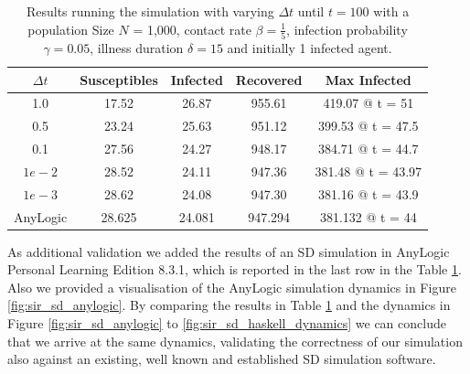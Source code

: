 \begin{table}
  \centering
  \begin{tabular}{ c || c | c | c | c }
    $\Delta t$ & Susceptibles & Infected & Recovered & Max Infected \\ \hline \hline 
    1.0 & 17.52 & 26.87 & 955.61 & 419.07 @ t = 51 \\ \hline
    0.5 & 23.24 & 25.63 & 951.12 & 399.53 @ t = 47.5 \\ \hline
    0.1 & 27.56 & 24.27 & 948.17 & 384.71 @ t = 44.7 \\ \hline
    $1e-2$ & 28.52 & 24.11 & 947.36 & 381.48 @ t = 43.97 \\ \hline
    $1e-3$ & 28.62 & 24.08 & 947.30 & 381.16 @ t = 43.9  \\ \hline \hline
    AnyLogic & 28.625 & 24.081 & 947.294 & 381.132 @ t = 44
    
  \end{tabular}
  \caption{Results running the simulation with varying $\Delta t$ until $t = 100$ with a population Size $N$ = 1,000, contact rate $\beta = \frac{1}{5}$, infection probability $\gamma = 0.05$, illness duration $\delta = 15$ and initially 1 infected agent.}
  \label{tab:delta_influence}
\end{table}

As additional validation we added the results of an SD simulation in AnyLogic Personal Learning Edition 8.3.1, which is reported in the last row in the Table \ref{tab:delta_influence}. Also we provided a visualisation of the AnyLogic simulation dynamics in Figure \ref{fig:sir_sd_anylogic}. By comparing the results in Table \ref{tab:delta_influence} and the dynamics in Figure \ref{fig:sir_sd_anylogic} to \ref{fig:sir_sd_haskell_dynamics} we can conclude that we arrive at the same dynamics, validating the correctness of our simulation also against an existing, well known and established SD simulation software.

